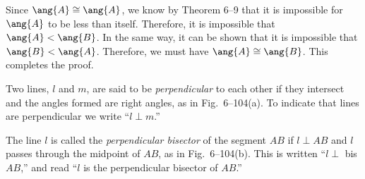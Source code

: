 \documentclass[11pt]{book}
\theoremstyle{bkplain}
\theoremstyle{XIplainnote}
\theoremstyle{bkplain}
\theoremstyle{bkplain}
\begin{document}
Since $\ang{A} \cong \ang{A}$, we know by Theorem 6--9 that it is impossible
for $\ang{A}$ to be less than itself. Therefore, it is impossible that $\ang{A}
< \ang{B}$. In the same way, it can be shown that it is impossible that
$\ang{B} < \ang{A}$. Therefore, we must have $\ang{A} \cong \ang{B}$. This
completes the proof.

\begin{definition}
Two lines, $l$ and $m$, are said to be \emph{perpendicular} to each other if
they intersect and the angles formed are right angles, as in Fig.~6--104(a).
To indicate that lines are perpendicular we write ``$l \perp m$.''
\end{definition}

\FIGVIONEHUNDREDFOUR

The line $l$ is called the \emph{perpendicular bisector} of the segment $AB$ if
$l \perp AB$ and $l$ passes through the midpoint of $AB$, as in
Fig.~6--104(b). This is written ``$l \perp$ bis $AB$,'' and read ``$l$ is the
perpendicular bisector of $AB$.''
\end{document}

